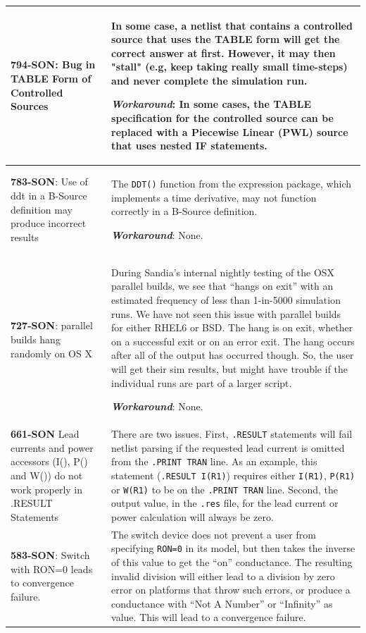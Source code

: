 {\begin{longtable}[h] {>{\raggedright\small}m{2in}|>{\raggedright\let\\\tabularnewline\small}m{3.5in}}
\textbf{794-SON}: Bug in TABLE Form of \Xyce{} Controlled Sources & In some case, a \Xyce{}
netlist that contains a controlled source that uses the TABLE form will get
the correct answer at first.  However, it may then "stall" (e.g, keep
taking really small time-steps) and never complete the simulation run.

\textbf{\textit{Workaround}}: In some cases, the TABLE specification for the controlled
source can be replaced with a Piecewise Linear (PWL) source that uses
nested IF statements. \\ \hline

\textbf{783-SON}: Use of ddt in a B-Source definition may produce incorrect
results & The \texttt{DDT()} function from the \Xyce{} expression
package, which implements a time derivative, may not function
correctly in a B-Source definition.

\textbf{\textit{Workaround}}: None. \\ \hline

\textbf{727-SON}: \Xyce{} parallel builds hang randomly on OS X & During
Sandia's internal nightly testing of the OSX parallel builds, we see
that \Xyce{} ``hangs on exit'' with an estimated frequency of less
than 1-in-5000 simulation runs.  We have not seen this issue with
parallel builds for either RHEL6 or BSD.  The hang is on exit, whether
on a successful exit or on an error exit.  The hang occurs after all
of the \Xyce{} output has occurred though.  So, the user will get
their sim results, but might have trouble if the individual \Xyce{}
runs are part of a larger script.

\textbf{\textit{Workaround}}: None. \\ \hline

\textbf{661-SON} Lead currents and power accessors (I(), P() and W()) do
not work properly in .RESULT Statements & There are two issues.
First, \texttt{.RESULT} statements will fail netlist parsing if the
requested lead current is omitted from the \texttt{.PRINT TRAN}
line.  As an example, this statement (\texttt{.RESULT I(R1)}) requires
either \texttt{I(R1)},
\texttt{P(R1)} or \texttt{W(R1)} to be on the \texttt{.PRINT TRAN} line.
Second, the output value, in the \texttt{.res} file, for the lead
current or power calculation will always be zero.
\\ \hline

\textbf{583-SON}: Switch with RON=0 leads to convergence failure. &
The switch device does not prevent a user from
specifying \texttt{RON=0} in its model, but then takes the inverse of
this value to get the ``on'' conductance.  The resulting invalid
division will either lead to a division by zero error on platforms
that throw such errors, or produce a conductance with ``Not A Number''
or ``Infinity'' as value.  This will lead to a convergence failure.


\end{longtable}}
